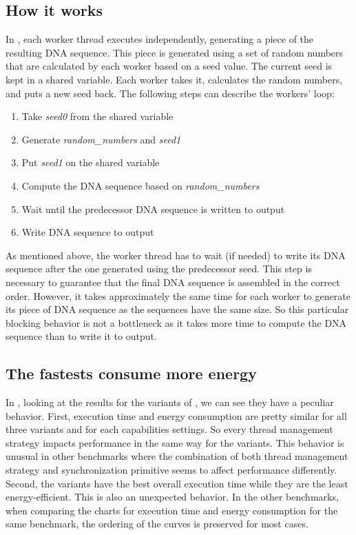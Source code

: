 \subsection{How it works}\label{subsec:how}
In \fasta, each worker thread executes independently, generating a piece of the resulting DNA sequence. This piece is generated using a set of random numbers that are calculated by each worker based on a seed value. The current seed is kept in a shared variable. Each worker takes it, calculates the random numbers, and puts a new seed back. The following steps can describe the workers' loop:
\begin{enumerate}
	\item Take \textit{seed0} from the shared variable
	\item Generate \textit{random\_numbers} and \textit{seed1}
	\item Put \textit{seed1} on the shared variable
	\item Compute the DNA sequence based on \textit{random\_numbers}
	\item Wait until the predecessor DNA sequence is written to output
	\item Write DNA sequence to output
\end{enumerate}

As mentioned above, the worker thread has to wait (if needed) to write its DNA sequence after the one generated using the predecessor seed. This step is necessary to guarantee that the final DNA sequence is assembled in the correct order. However, it takes approximately the same time for each worker to generate its piece of DNA sequence as the sequences have the same size. So this particular blocking behavior is not a bottleneck as it takes more time to compute the DNA sequence than to write it to output.

\subsection{The fastests consume more energy}
In , looking at the results for the \TVar variants of \fasta, we can see they have a peculiar behavior. First, execution time and energy consumption are pretty similar for all three variants and for each capabilities settings. So every thread management strategy impacts performance in the same way for the \TVar variants. This behavior is unusual in other benchmarks where the combination of both thread management strategy and synchronization primitive seems to affect performance differently. Second, the \TVar variants have the best overall execution time while they are the least energy-efficient. This is also an unexpected behavior. In the other benchmarks, when comparing the charts for execution time and energy consumption for the same benchmark, the ordering of the curves is preserved for most cases.

